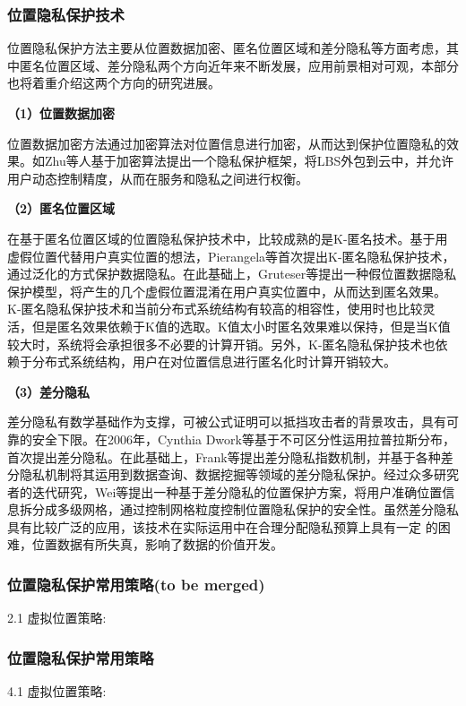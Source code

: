 \documentclass[zihao=-4]{ctexart}
\begin{document}
\subsubsection{位置隐私保护技术}
位置隐私保护方法主要从位置数据加密、匿名位置区域和差分隐私等方面考虑，其中匿名位置区域、差分隐私两个方向近年来不断发展，应用前景相对可观，本部分也将着重介绍这两个方向的研究进展。
\par 
\textbf{（1）位置数据加密}
\par 
位置数据加密方法通过加密算法对位置信息进行加密，从而达到保护位置隐私的效果。如Zhu等人基于加密算法提出一个隐私保护框架，将LBS外包到云中，并允许用户动态控制精度，从而在服务和隐私之间进行权衡。\cite{czh_6.3}
\par 
\textbf{（2）匿名位置区域}
\par 
在基于匿名位置区域的位置隐私保护技术中，比较成熟的是K-匿名技术。基于用虚假位置代替用户真实位置的想法，Pierangela等首次提出K-匿名隐私保护技术，通过泛化的方式保护数据隐私。\cite{czh_6.4}在此基础上，Gruteser等\cite{czh_6.5}提出一种假位置数据隐私保护模型，将产生的几个虚假位置混淆在用户真实位置中，从而达到匿名效果。K-匿名隐私保护技术和当前分布式系统结构有较高的相容性，使用时也比较灵活，但是匿名效果依赖于K值的选取。K值太小时匿名效果难以保持，但是当K值较大时，系统将会承担很多不必要的计算开销。另外，K-匿名隐私保护技术也依赖于分布式系统结构，用户在对位置信息进行匿名化时计算开销较大。
\par 
\textbf{（3）差分隐私}
\par 
差分隐私有数学基础作为支撑，可被公式证明可以抵挡攻击者的背景攻击，具有可靠的安全下限。在2006年，Cynthia Dwork等\cite{czh_6.6}基于不可区分性运用拉普拉斯分布，首次提出差分隐私。在此基础上，Frank等\cite{czh_6.7}提出差分隐私指数机制，并基于各种差分隐私机制将其运用到数据查询、数据挖掘等领域的差分隐私保护。经过众多研究者的迭代研究，Wei等\cite{czh_6.8}提出一种基于差分隐私的位置保护方案，将用户准确位置信息拆分成多级网格，通过控制网格粒度控制位置隐私保护的安全性。虽然差分隐私具有比较广泛的应用，该技术在实际运用中在合理分配隐私预算上具有一定 的困难，位置数据有所失真，影响了数据的价值开发。

\iffalse
\subsubsection{位置隐私保护常用策略(to be merged)}
2.1 虚拟位置策略: \par

\subsubsection{位置隐私保护常用策略}
4.1 虚拟位置策略: \par
\end{document}
